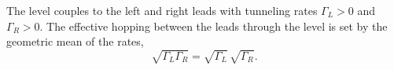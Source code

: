 \documentclass{article}
\begin{document}
The level couples to the left and right leads with tunneling rates $\Gamma_L>0$ and $\Gamma_R>0$.
The effective hopping between the leads through the level is set by the geometric mean of the rates,
\begin{equation}
\sqrt{\Gamma_L\Gamma_R} = \sqrt{\Gamma_L}\,\sqrt{\Gamma_R} .
\label{eq:geo}
\end{equation}
\end{document}
